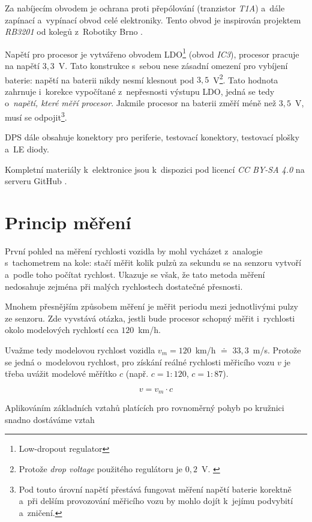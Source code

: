 Za nabíjecím obvodem je ochrana proti přepólování (tranzistor \textit{T1A})
a~dále zapínací a~vypínací obvod celé elektroniky. Tento obvod je inspirován
projektem \textit{RB3201} \cite{rb3201} od kolegů z~Robotiky Brno
\cite{roboticsbrno}.

Napětí pro procesor je vytvářeno obvodem \gls{LDO}\footnote{Low-dropout regulator}
(obvod \textit{IC3}), procesor pracuje na napětí $3,3$~V. Tato konstrukce
s~sebou nese zásadní omezení pro vybíjení baterie: napětí na baterii nikdy nesmí
klesnout pod $3,5$~V\footnote{Protože \textit{drop voltage} použitého
regulátoru je $0,2$~V. \cite{ldo:datasheet}}. Tato hodnota zahrnuje
i~korekce vypočítané z~nepřesnosti výstupu \gls{LDO}, jedná se tedy o~\textit{napětí,
které měří procesor}. Jakmile procesor na baterii změří méně než $3,5$~V, musí
se odpojit\footnote{Pod touto úrovní napětí přestává fungovat měření napětí
baterie korektně a~při delším provozování měřicího vozu by mohlo dojít k~jejímu
podvybití a~zničení.}.

DPS dále obsahuje konektory pro periferie, testovací konektory, testovací
plošky a~LE diody.

Kompletní materiály k~elektronice jsou k~dispozici pod licencí \textit{CC BY-SA
4.0} na serveru GitHub \cite{wsm-pcb}.

\section{Princip měření}
\label{sec:wsm-mer-princip}

První pohled na měření rychlosti vozidla by mohl vycházet z~analogie
s~tachometrem na kole: stačí měřit kolik pulzů za sekundu se na senzoru vytvoří
a~podle toho počítat rychlost. Ukazuje se však, že tato metoda měření nedosahuje
zejména při malých rychlostech dostatečné přesnosti.

Mnohem přesnějším způsobem měření je měřit periodu mezi jednotlivými pulzy ze
senzoru. Zde vyvstává otázka, jestli bude procesor schopný měřit i~rychlosti
okolo modelových rychlostí cca $120$~km/h.

Uvažme tedy modelovou rychlost vozidla $v_m = 120$~km/h $\doteq$ $33,3$~m/s.
Protože se jedná o~modelovou rychlost, pro získání reálné rychlosti měřicího
vozu $v$ je třeba uvážit modelové měřítko $c$ (např. $c = 1:120$, $c = 1:87$).

$$v = v_m \cdot c$$

Aplikováním základních vztahů platících pro rovnoměrný pohyb po kružnici snadno
dostáváme vztah


